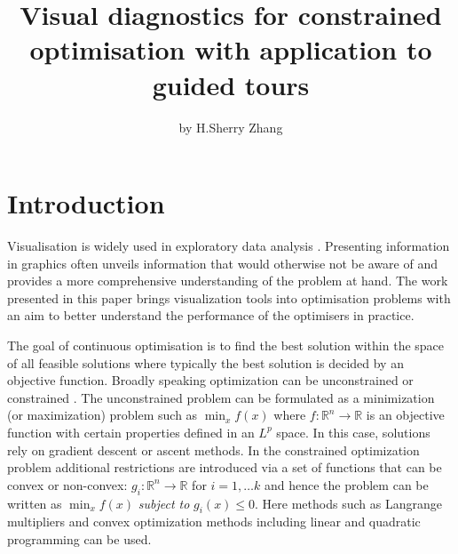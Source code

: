 \title{Visual diagnostics for constrained optimisation with application to
guided tours}
\author{by H.Sherry Zhang}

\maketitle


\hypertarget{introduction}{%
\section{Introduction}\label{introduction}}

Visualisation is widely used in exploratory data analysis
\citep{tukey1977exploratory, unwin2015graphical, healy2018data, wilke2019fundamentals}.
Presenting information in graphics often unveils information that would
otherwise not be aware of and provides a more comprehensive
understanding of the problem at hand. The work presented in this paper
brings visualization tools into optimisation problems with an aim to
better understand the performance of the optimisers in practice.

The goal of continuous optimisation is to find the best solution within
the space of all feasible solutions where typically the best solution is
decided by an objective function. Broadly speaking optimization can be
unconstrained or constrained \citep{kelley1999iterative}. The
unconstrained problem can be formulated as a minimization (or
maximization) problem such as \(\min_{x} f(x)\) where
\(f:\mathbb{R}^n \rightarrow \mathbb{R}\) is an objective function with
certain properties defined in an \(L^p\) space. In this case, solutions
rely on gradient descent or ascent methods. In the constrained
optimization problem additional restrictions are introduced via a set of
functions that can be convex or non-convex:
\(g_i:\mathbb{R}^n \rightarrow \mathbb{R}\) for \(i = 1, \ldots k\) and
hence the problem can be written as \(\min_{x} f(x)\) \emph{subject to}
\(g_i(x) \leq 0\). Here methods such as Langrange multipliers and convex
optimization methods including linear and quadratic programming can be
used.

